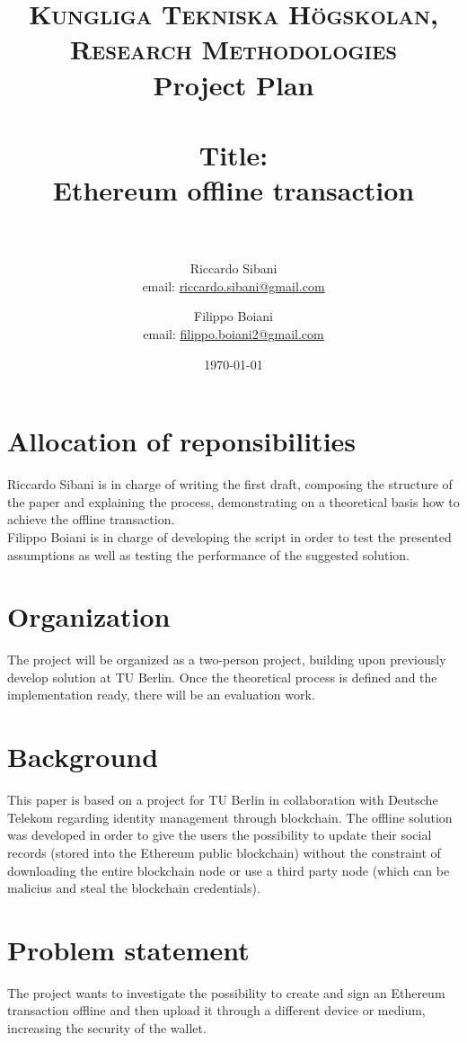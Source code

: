 \documentclass[paper=a4, fontsize=11pt]{scrartcl} %
\title{
\normalfont \normalsize
\textsc{Kungliga Tekniska Högskolan, Research Methodologies} \\ [10pt] %
Project Plan \\ [25pt]
\horrule{0.5pt} \\[0.4cm] %
\huge Title:\\Ethereum offline transaction \\ %
\vspace{5mm}
\horrule{2pt} \\[0.5cm] %
}
\author{Riccardo Sibani \\ email: \href{mailto:riccardo.sibani@gmail.com}{riccardo.sibani@gmail.com}
   \and Filippo Boiani \\ email: \href{mailto:filippo.boiani2@gmail.com}{filippo.boiani2@gmail.com} } %
\date{\normalsize\today} %
\numberwithin{equation}{section} %
\numberwithin{figure}{section} %
\numberwithin{table}{section} %
\begin{document}
\maketitle %


\section{Allocation of reponsibilities}
Riccardo Sibani is in charge of writing the first draft, composing the structure of the paper and explaining the process, demonstrating on a theoretical basis how to achieve the offline transaction. \\
Filippo Boiani is in charge of developing the script in order to test the presented assumptions as well as testing the performance of the suggested solution.

\section{Organization}
The project will be organized as a two-person project, building upon previously develop solution at TU Berlin. Once the theoretical process is defined and the implementation ready, there will be an evaluation work.

\section{Background}

This paper is based on a project for TU Berlin in collaboration with Deutsche Telekom regarding identity management through blockchain. The offline solution was developed in order to give the users the possibility to update their social records (stored into the Ethereum public blockchain) without the constraint of downloading the entire blockchain node or use a third party node (which can be malicius and steal the blockchain credentials).

\section{Problem statement}

The project wants to investigate the possibility to create and sign an Ethereum transaction offline and then upload it through a different device or medium, increasing the security of the wallet.
\end{document}
